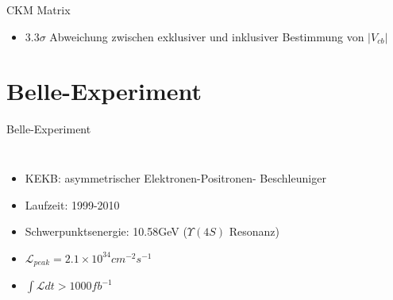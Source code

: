 \documentclass{beamer}
\begin{document}
\begin{frame}{CKM Matrix}
\begin{itemize}
    \item 3.3$\sigma$ Abweichung zwischen exklusiver und inklusiver Bestimmung von $|V_{cb}|$
\end{itemize}
\end{frame}

\section{Belle-Experiment}
\begin{frame}{Belle-Experiment}
\begin{columns}
  \begin{itemize}
    \item  { KEKB: asymmetrischer Elektronen-Positronen-  Beschleuniger}
  \item  {Laufzeit: 1999-2010}
    \item  {Schwerpunktsenergie: 10.58GeV ($\Upsilon(4S)$ Resonanz)}
  \item  {$\mathcal{L}_{peak}=2.1 \times 10^{34} cm^{-2} s^{-1}$}
  \item  {$\int \mathcal{L} dt > 1000 fb^{-1}  $}

  \end{itemize}
\end{columns}
\end{frame}
\end{document}
